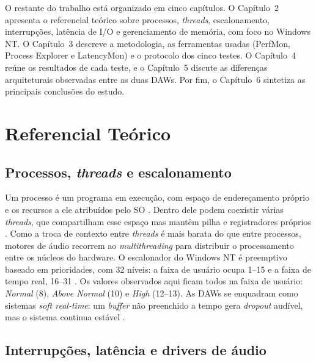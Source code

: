 \documentclass[tcc1]{classe_uftex/uftex}
\begin{document}
O restante do trabalho está organizado em cinco capítulos. O Capítulo~2
apresenta o referencial teórico sobre processos, \textit{threads},
escalonamento, interrupções, latência de I/O e gerenciamento de
memória, com foco no Windows NT. O Capítulo~3 descreve a metodologia,
as ferramentas usadas (PerfMon, Process Explorer e LatencyMon) e o
protocolo dos cinco testes. O Capítulo~4 reúne os resultados de cada
teste, e o Capítulo~5 discute as diferenças arquiteturais observadas
entre as duas DAWs. Por fim, o Capítulo~6 sintetiza as principais
conclusões do estudo.


\chapter{Referencial Teórico}

\section{Processos, \textit{threads} e escalonamento}

Um processo é um programa em execução, com espaço de endereçamento
próprio e os recursos a ele atribuídos pelo SO \cite{silberschatz2018}.
Dentro dele podem coexistir várias \textit{threads}, que compartilham
esse espaço mas mantêm pilha e registradores próprios
\cite{tanenbaum2016}. Como a troca de contexto entre \textit{threads}
é mais barata do que entre processos, motores de áudio recorrem ao
\textit{multithreading} para distribuir o processamento entre os
núcleos do hardware. O escalonador do Windows NT é preemptivo baseado
em prioridades, com 32 níveis: a faixa de usuário ocupa 1--15 e a
faixa de tempo real, 16--31 \cite{stallings2017os}. Os valores
observados aqui ficam todos na faixa de usuário: \textit{Normal} (8),
\textit{Above Normal} (10) e \textit{High} (12--13). As DAWs se
enquadram como sistemas \textit{soft real-time}: um \textit{buffer}
não preenchido a tempo gera \textit{dropout} audível, mas o sistema
continua estável \cite{silberschatz2018}.

\section{Interrupções, latência e drivers de áudio}
\end{document}
